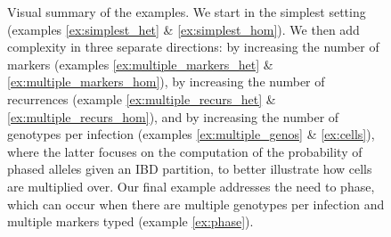 \documentclass{article}
\begin{document}
\begin{figure}[H]
    \begin{center}
    
\end{center}
    \caption{Visual summary of the examples. We start in the simplest setting (examples \ref{ex:simplest_het} \& \ref{ex:simplest_hom}). We then add complexity in three separate directions: by increasing the number of markers (examples \ref{ex:multiple_markers_het} \& \ref{ex:multiple_markers_hom}), by increasing the number of recurrences (example \ref{ex:multiple_recurs_het} \& \ref{ex:multiple_recurs_hom}), and by increasing the number of genotypes per infection (examples \ref{ex:multiple_genos} \& \ref{ex:cells}), where the latter focuses on the computation of the probability of phased alleles given an IBD partition, to better illustrate how cells are multiplied over. Our final example addresses the need to phase, which can occur when there are multiple genotypes per infection and multiple markers typed (example \ref{ex:phase}).}
    \label{fig:my_label}
\end{figure}






\end{document}
